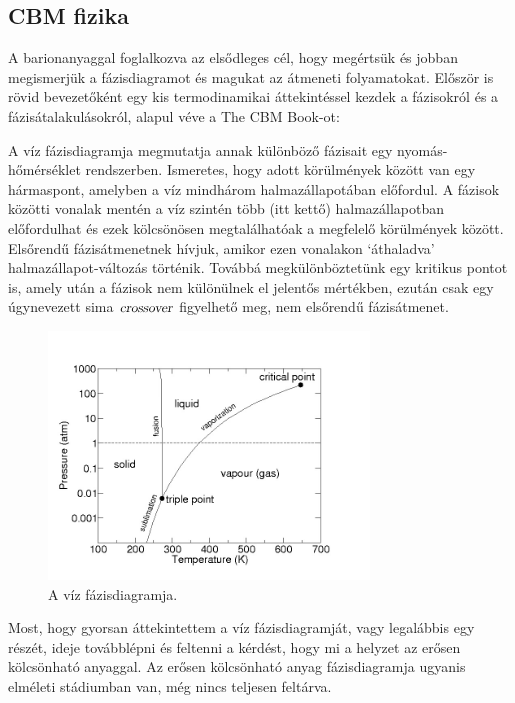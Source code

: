 \documentclass[a4paper,12pt]{article}
\begin{document}
\subsection{ CBM fizika }
\vspace{5mm}
\par A barionanyaggal foglalkozva az elsődleges cél, hogy megértsük és jobban megismerjük a fázisdiagramot és magukat az átmeneti folyamatokat.
Először is rövid bevezetőként egy kis termodinamikai áttekintéssel kezdek a fázisokról és a fázisátalakulásokról, alapul véve a The CBM Book-ot:
\vspace{5mm}
\par A víz fázisdiagramja megmutatja annak különböző fázisait egy nyomás-hőmérséklet rendszerben. Ismeretes, hogy adott körülmények között van egy
hármaspont, amelyben a víz mindhárom halmazállapotában előfordul. A fázisok közötti vonalak mentén a víz szintén több (itt kettő) halmazállapotban
előfordulhat és ezek kölcsönösen megtalálhatóak a megfelelő körülmények között. Elsőrendű fázisátmenetnek hívjuk, amikor ezen vonalakon `áthaladva' halmazállapot-változás
történik. Továbbá megkülönböztetünk egy kritikus pontot is, amely után a fázisok nem különülnek el jelentős mértékben, ezután
csak egy úgynevezett sima $\textsl{crossover}$ figyelhető meg, nem elsőrendű fázisátmenet.
\begin{figure}[H]
	\centering
	\includegraphics[width=0.76\textwidth]{water_phase.jpg}
	\caption{ A víz fázisdiagramja. }
\end{figure}
\par Most, hogy gyorsan áttekintettem a víz fázisdiagramját, vagy legalábbis egy részét, ideje továbblépni és feltenni a kérdést, hogy mi 
a helyzet az erősen kölcsönható anyaggal. Az erősen kölcsönható anyag fázisdiagramja ugyanis elméleti stádiumban van, még nincs teljesen feltárva.
\end{document}

